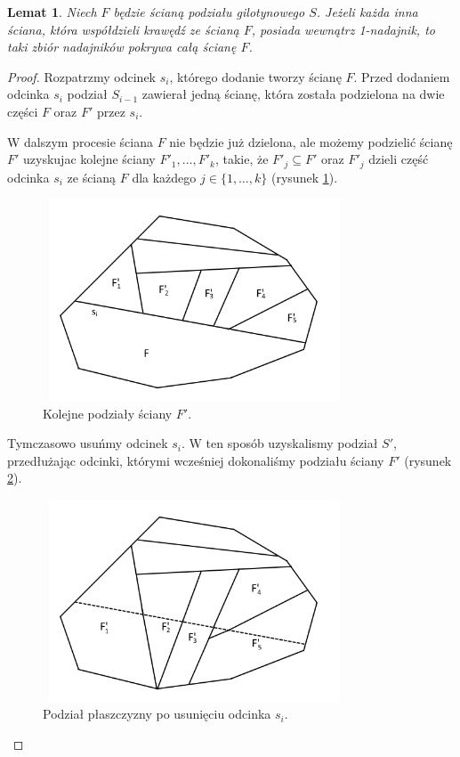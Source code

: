 \documentclass[brudnopis]{xmgr}
\newtheorem{Lemat}{Lemat}
\theoremstyle{definition}
\begin{document}
\begin{Lemat}\label{sasiednie sciany strzega F} \cite{knadajniki}
  Niech $F$ będzie ścianą podziału gilotynowego $S$. Jeżeli każda inna ściana, która współdzieli krawędź ze ścianą $F$, posiada wewnątrz 1-nadajnik, to taki zbiór nadajników pokrywa całą ścianę $F$.
\end{Lemat}
\begin{proof}
\indent Rozpatrzmy odcinek $s_i$, którego dodanie tworzy ścianę $F$. Przed dodaniem odcinka $s_i$ podział $S_{i-1}$ zawierał jedną ścianę, która została podzielona na dwie części $F$ oraz $F'$ przez $s_i$. 

W dalszym procesie ściana $F$ nie będzie już dzielona, ale możemy podzielić ścianę $F'$ uzyskujac kolejne ściany $F'_1, \ldots, F'_k$, takie, że $F'_j \subseteq F'$ oraz $F'_j$ dzieli część odcinka $s_i$ ze ścianą $F$ dla każdego $j \in \{1,\ldots,k\}$ (rysunek \ref{fig:podzial F' na kolejne ściany}).

\begin{figure}[ht!]
  \centering
  \includegraphics[width=9cm,height=6cm]{rysunki/podzial_F'.png}
  \caption{Kolejne podziały ściany $F'$.}
  \label{fig:podzial F' na kolejne ściany}
\end{figure} 
Tymczasowo usuńmy odcinek $s_i$. W ten sposób uzyskalismy podział $S'$, przedłużając odcinki, którymi wcześniej dokonaliśmy podziału ściany $F'$ (rysunek \ref{fig:podzial po usunieciu si}).

\begin{figure}[ht!]
  \centering
  \includegraphics[width=9cm,height=6cm]{rysunki/usuniete_si.png}
  \caption{Podział płaszczyzny po usunięciu odcinka $s_i$.}
  \label{fig:podzial po usunieciu si}
\end{figure} 


\end{proof}
\end{document}
